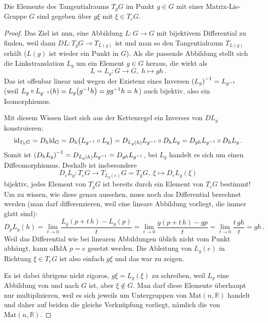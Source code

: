 \documentclass[../H_Analysis_main.tex]{subfiles}
\begin{document}
\begin{satz}\label{satz:tangraummlg}
Die Elemente des Tangentialraums $T_g G$ im Punkt $g \in G$ mit einer Matrix-Lie-Gruppe $G$ sind gegeben über $g \xi$ mit $\xi \in T_e G$.
\end{satz}
\begin{proof}
Das Ziel ist nun, eine Abbildung $L: G \rightarrow G$ mit bijektivem Differential zu finden, weil dann $DL: T_g G \rightarrow T_{L(g)}$ ist und man so den Tangentialraum $T_{L(g)}$ erhält ($L(g)$ ist wieder ein Punkt in $G$). Als die passende Abbildung stellt sich die Linkstranslation $L_g$ um ein Element $g \in G$ heraus, die wirkt als
\begin{equation}
L = L_g: G \rightarrow G, \; h \mapsto g h \, .
\end{equation}
Das ist offenbar linear und wegen der Existenz eines Inversen $\qty(L_g)^{-1} = L_{g^{-1}}$ (weil $L_g \circ L_{g^{-1}} (h) = L_g \qty(g^{-1} h) = g g^{-1} h = h$) auch bijektiv, also ein Isomorphismus.


Mit diesem Wissen lässt sich aus der Kettenregel ein Inverses von $DL_g$ konstruieren:
\begin{equation*}
\text{id}_{T_h G} = D_h \text{id}_G = D_h \qty(L_{g^{-1}} \circ L_g) = D_{L_g(h)} L_{g^{-1}} \circ D_h L_g = D_{gh} L_{g^{-1}} \circ D_h L_g \, .
\end{equation*}
Somit ist $\qty(D_h L_g)^{-1} = D_{L_g(h)} L_{g^{-1}} = D_{gh} L_{g^{-1}}$, bei $L_g$ handelt es sich um einen Diffeomorphismus. Deshalb ist insbesondere
\begin{equation}
D_e L_g: T_e G \rightarrow T_{L_g(e)} G = T_g G, \; \xi \mapsto D_e L_g(\xi)
\end{equation}
bijektiv, jedes Element von $T_g G$ ist bereits durch ein Element von $T_e G$ bestimmt! Um zu wissen, wie diese genau aussehen, muss noch das Differential berechnet werden (man darf differenzieren, weil eine lineare Abbildung vorliegt, die immer glatt sind):
\begin{equation}
D_p L_g (h) = \lim_{t \rightarrow 0} \frac{L_g(p + t \, h) - L_g(p)}{t} = \lim_{t \rightarrow 0} \frac{g(p + t \, h) - gp}{t} = \lim_{t \rightarrow 0} \frac{t \, gh}{t} = gh \, .
\end{equation}
Weil das Differential wie bei linearen Abbildungen üblich nicht vom Punkt abhängt, kann oBdA $p = e$ gesetzt werden. Die Ableitung von $L_g(e)$ in Richtung $\xi \in T_e G$ ist also einfach $g \xi$ und das war zu zeigen.

Es ist dabei übrigens nicht rigoros, $g\xi = L_g(\xi)$ zu schreiben, weil $L_g$ eine Abbildung von und nach $G$ ist, aber $\xi \notin G$. Man darf diese Elemente überhaupt nur multiplizieren, weil es sich jeweils um Untergruppen von $\text{Mat}(n, \mathbb{R})$ handelt und daher auf beiden die gleiche Verknüpfung vorliegt, nämlich die von $\text{Mat}(n, \mathbb{R})$.
\end{proof}
\end{document}
